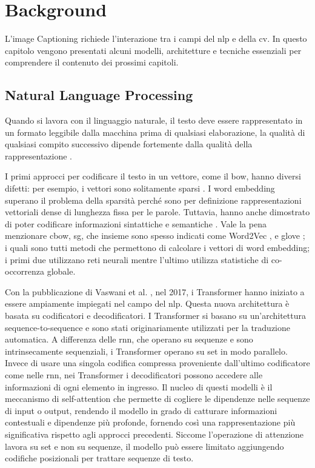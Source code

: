 \chapter{Background}
L'image Captioning richiede l'interazione tra i campi del \acrfull{nlp} e della \acrfull{cv}. In questo capitolo vengono presentati alcuni modelli, architetture e tecniche essenziali per comprendere il contenuto dei prossimi capitoli.
\section{Natural Language Processing}
Quando si lavora con il linguaggio naturale, il testo deve essere rappresentato in un formato leggibile dalla macchina prima di qualsiasi elaborazione, la qualità di qualsiasi compito successivo dipende fortemente dalla qualità della rappresentazione \cite{babic2020survey}.

I primi approcci per codificare il testo in un vettore, come il \acrfull{bow}, hanno diversi difetti: per esempio, i vettori sono solitamente sparsi \cite{chen2013alternative}.
I word embedding superano il problema della sparsità perché sono per definizione rappresentazioni vettoriali dense di lunghezza fissa per le parole. Tuttavia, hanno anche dimostrato di poter codificare informazioni sintattiche e semantiche \cite{almeida2019word}.
Vale la pena menzionare \acrfull{cbow}, \acrfull{sg}, che insieme sono spesso indicati come Word2Vec \cite{mikolov2013efficient}, e \acrfull{glove} \cite{pennington2014glove}; i quali sono tutti metodi che permettono di calcolare i vettori di word embedding; i primi due utilizzano reti neurali mentre l'ultimo utilizza statistiche di co-occorrenza globale.

Con la pubblicazione di Vaswani et al. \cite{vaswani2017attention}, nel 2017, i Transformer hanno iniziato a essere ampiamente impiegati nel campo del \acrshort{nlp}. 
Questa nuova architettura è basata su codificatori e decodificatori. I Transformer si basano su un'architettura sequence-to-sequence e sono stati originariamente utilizzati per la traduzione automatica. A differenza delle \acrfull{rnn}, che operano su sequenze e sono intrinsecamente sequenziali, i Transformer operano su set in modo parallelo. Invece di usare una singola codifica compressa proveniente dall'ultimo codificatore come nelle \acrshort{rnn}, nei Transformer i decodificatori possono accedere alle informazioni di ogni elemento in ingresso. Il nucleo di questi modelli è il meccanismo di self-attention che permette di cogliere le dipendenze nelle sequenze di input o output, rendendo il modello in grado di catturare informazioni contestuali e dipendenze più profonde, fornendo così una rappresentazione più significativa rispetto agli approcci precedenti. Siccome l'operazione di attenzione lavora su set e non su sequenze, il modello può essere limitato aggiungendo codifiche posizionali per trattare sequenze di testo.


